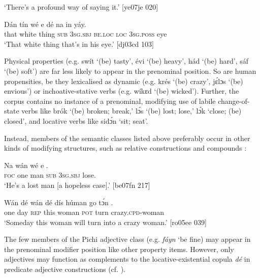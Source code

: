 \glt ‘There’s a profound way of saying it.’ [ye07je 020]
\z


\ea%
    \label{ex:key:234}
    \gll Dán    tín    wé  e    dé    na  in    yáy.\\
that  white  thing  \textsc{sub}  \textsc{3sg.sbj}  \textsc{be.loc}  \textsc{loc}  \textsc{3sg.poss}  eye\\

\glt ‘That white thing that’s in his eye.’ [dj03cd 103]
\z

Physical properties (e.g. swít ‘(be) tasty’, évi ‘(be) heavy’, hád ‘(be) hard’, sáf ‘(be) soft’) are far less likely to appear in the prenominal position. So are human propensities, be they lexicalised as dynamic (e.g. krés ‘(be) crazy’, jɛ́lɔs ‘(be) envious’) or inchoative-stative verbs (e.g. wíkɛd ‘(be) wicked’). Further, the corpus contains no instance of a prenominal, modifying use of labile{\fff} change-of-state verbs like brók ‘(be) broken; break,’ lɔ́s ‘(be) lost; lose,’ lɔ́k ‘close; (be) closed’, and locative verbs{\fff} like sidɔ́n ‘sit; seat’. 


Instead, members of the semantic classes listed above preferably occur in other kinds of modifying structures, such as relative constructions  and compounds : 



\ea%
    \label{ex:key:235}
    \gll Na  wán     wé  e    .\\
\textsc{foc}  one    man    \textsc{sub}  \textsc{3sg.sbj}  lose.\\

\glt ‘He’s a lost man [a hopeless case].’ [be07fn 217]
\z


\ea%
    \label{ex:key:236}
    \gll Wán    dé  {wán  dé}  dís  húman  go  tɔ́n  .\\
one    day  \textsc{rep}      this  woman  \textsc{pot}  turn  crazy.\textsc{cpd}{}-woman\\

\glt ‘Someday this woman will turn into a crazy woman.’ [ro05ee 039]
\z

The few members of the Pichi adjective class (e.g. \textit{fáyn} ‘be fine) may appear in the prenominal modifier position like other property items. However, only adjectives may function as complements to the locative-existential copula \textit{dé} in predicate adjective constructions (cf. ).

